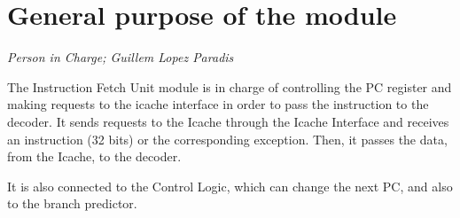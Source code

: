 \section{General purpose of the module}
\textit{Person in Charge; Guillem Lopez Paradis}

The Instruction Fetch Unit module is in charge of controlling the PC register  and making requests to the icache interface in order to pass the instruction to the decoder. It sends requests to the Icache through the Icache Interface and receives an instruction (32 bits) or the corresponding exception. Then, it passes the data, from the Icache, to the decoder.

It is also connected to the Control Logic, which can change the next PC, and also to the branch predictor.
